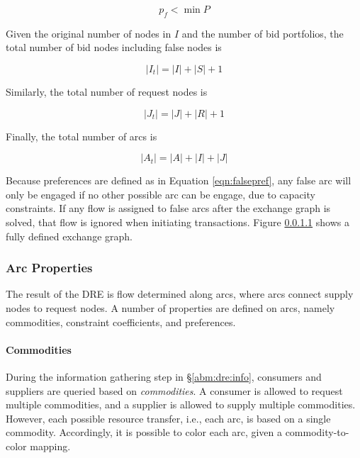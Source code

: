\begin{equation}\label{eqn:falsepref}
  p_{f} < \min P
\end{equation}

Given the original number of nodes in $I$ and the number of bid portfolios, the
total number of bid nodes including false nodes is

\begin{equation}
  \left|{I_t}\right| = \left|{I}\right| + \left|{S}\right| + 1
\end{equation}

Similarly, the total number of request nodes is

\begin{equation}
  \left|{J_t}\right| = \left|{J}\right| + \left|{R}\right| + 1
\end{equation}

Finally, the total number of arcs is

\begin{equation}
  \left|{A_t}\right| = \left|{A}\right| + \left|{I}\right| + \left|{J}\right|
\end{equation}

Because preferences are defined as in Equation \ref{eqn:falsepref}, any false
arc will only be engaged if no other possible arc can be engage, due to capacity
constraints. If any flow is assigned to false arcs after the exchange graph is
solved, that flow is ignored when initiating transactions. Figure \ref{} shows a
fully defined exchange graph.


\subsubsection{Arc Properties}\label{abm:dre:fctp:arcs}

The result of the DRE is flow determined along arcs, where arcs connect supply
nodes to request nodes. A number of properties are defined on arcs, namely
commodities, constraint coefficients, and preferences.

\paragraph{Commodities}

During the information gathering step in \S \ref{abm:dre:info}, consumers and
suppliers are queried based on \textit{commodities}. A consumer is allowed to
request multiple commodities, and a supplier is allowed to supply multiple
commodities. However, each possible resource transfer, i.e., each arc, is based
on a single commodity. Accordingly, it is possible to color each arc, given a
commodity-to-color mapping.

